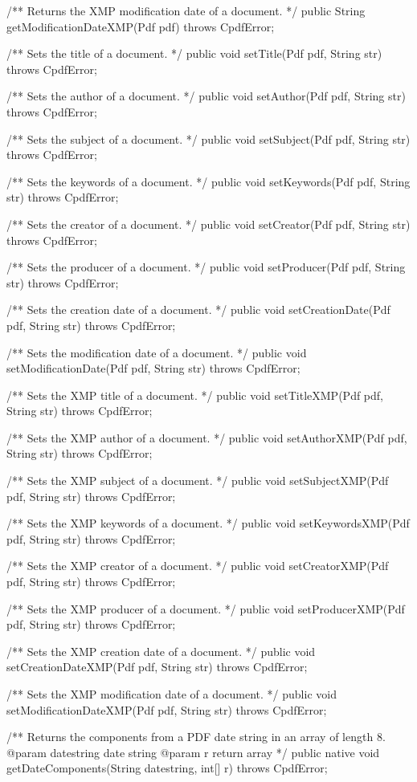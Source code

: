 /** Returns the XMP modification date of a document. */
public String getModificationDateXMP(Pdf pdf) throws CpdfError;

/** Sets the title of a document. */
public void setTitle(Pdf pdf, String str) throws CpdfError;

/** Sets the author of a document. */
public void setAuthor(Pdf pdf, String str) throws CpdfError;

/** Sets the subject of a document. */
public void setSubject(Pdf pdf, String str) throws CpdfError;

/** Sets the keywords of a document. */
public void setKeywords(Pdf pdf, String str) throws CpdfError;

/** Sets the creator of a document. */
public void setCreator(Pdf pdf, String str) throws CpdfError;

/** Sets the producer of a document. */
public void setProducer(Pdf pdf, String str) throws CpdfError;

/** Sets the creation date of a document. */
public void setCreationDate(Pdf pdf, String str) throws CpdfError;

/** Sets the modification date of a document. */
public void setModificationDate(Pdf pdf, String str) throws CpdfError;

/** Sets the XMP title of a document. */
public void setTitleXMP(Pdf pdf, String str) throws CpdfError;

/** Sets the XMP author of a document. */
public void setAuthorXMP(Pdf pdf, String str) throws CpdfError;

/** Sets the XMP subject of a document. */
public void setSubjectXMP(Pdf pdf, String str) throws CpdfError;

/** Sets the XMP keywords of a document. */
public void setKeywordsXMP(Pdf pdf, String str) throws CpdfError;

/** Sets the XMP creator of a document. */
public void setCreatorXMP(Pdf pdf, String str) throws CpdfError;

/** Sets the XMP producer of a document. */
public void setProducerXMP(Pdf pdf, String str) throws CpdfError;

/** Sets the XMP creation date of a document. */
public void setCreationDateXMP(Pdf pdf, String str) throws CpdfError;

/** Sets the XMP modification date of a document. */
public void setModificationDateXMP(Pdf pdf, String str) throws CpdfError;

/** Returns the components from a PDF date string in an array of length 8.
@param datestring date string
@param r return array */
public native void getDateComponents(String datestring, int[] r)
    throws CpdfError;

